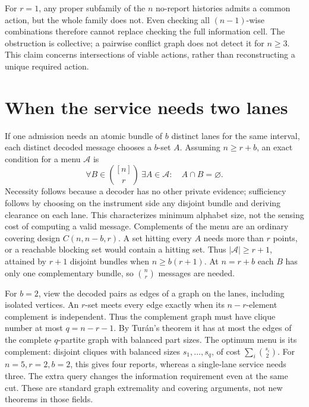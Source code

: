 \documentclass[11pt]{article}
\begin{document}
For $r=1$, any proper subfamily of the $n$ no-report histories admits a common action, but the whole family does not. Even checking all $(n-1)$-wise combinations therefore cannot replace checking the full information cell. The obstruction is collective; a pairwise conflict graph does not detect it for $n\ge3$. This claim concerns intersections of viable actions, rather than reconstructing a unique required action.

\section{When the service needs two lanes}
If one admission needs an atomic bundle of $b$ distinct lanes for the same interval, each distinct decoded message chooses a $b$-set $A$. Assuming $n\ge r+b$, an exact condition for a menu $\mathcal A$ is
\[
  \forall B\in\binom{[n]}r\ \exists A\in\mathcal A:\quad A\cap B=\varnothing .
\]
Necessity follows because a decoder has no other private evidence; sufficiency follows by choosing on the instrument side any disjoint bundle and deriving clearance on each lane. This characterizes minimum alphabet size, not the sensing cost of computing a valid message. Complements of the menu are an ordinary covering design $C(n,n-b,r)$. A set hitting every $A$ needs more than $r$ points, or a reachable blocking set would contain a hitting set. Thus $|\mathcal A|\ge r+1$, attained by $r+1$ disjoint bundles when $n\ge b(r+1)$. At $n=r+b$ each $B$ has only one complementary bundle, so $\binom nr$ messages are needed.

For $b=2$, view the decoded pairs as edges of a graph on the lanes, including isolated vertices. An $r$-set meets every edge exactly when its $n-r$-element complement is independent. Thus the complement graph must have clique number at most $q=n-r-1$. By Tur\'an's theorem it has at most the edges of the complete $q$-partite graph with balanced part sizes. The optimum menu is its complement: disjoint cliques with balanced sizes $s_1,\ldots,s_q$, of cost $\sum_i\binom{s_i}2$. For $n=5,r=2,b=2$, this gives four reports, whereas a single-lane service needs three. The extra query changes the information requirement even at the same cut. These are standard graph extremality and covering arguments, not new theorems in those fields.
\end{document}
